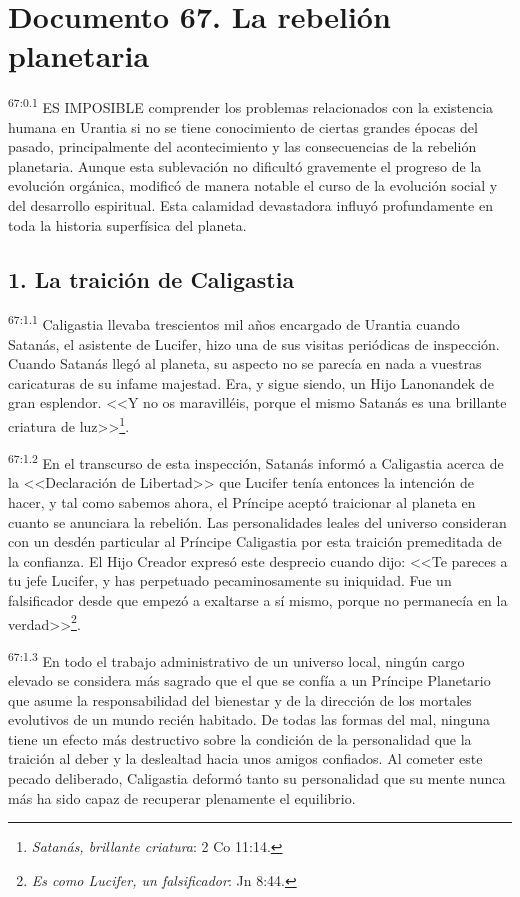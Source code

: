 \chapter{Documento 67. La rebelión planetaria}
\par
\textsuperscript{67:0.1} ES IMPOSIBLE comprender los problemas relacionados con la existencia humana en Urantia si no se tiene conocimiento de ciertas grandes épocas del pasado, principalmente del acontecimiento y las consecuencias de la rebelión planetaria. Aunque esta sublevación no dificultó gravemente el progreso de la evolución orgánica, modificó de manera notable el curso de la evolución social y del desarrollo espiritual. Esta calamidad devastadora influyó profundamente en toda la historia superfísica del planeta.

\section*{1. La traición de Caligastia}
\par
\textsuperscript{67:1.1} Caligastia llevaba trescientos mil años encargado de Urantia cuando Satanás, el asistente de Lucifer, hizo una de sus visitas periódicas de inspección. Cuando Satanás llegó al planeta, su aspecto no se parecía en nada a vuestras caricaturas de su infame majestad. Era, y sigue siendo, un Hijo Lanonandek de gran esplendor. <<Y no os maravilléis, porque el mismo Satanás es una brillante criatura de luz>>\footnote{\textit{Satanás, brillante criatura}: 2 Co 11:14.}.

\par
\textsuperscript{67:1.2} En el transcurso de esta inspección, Satanás informó a Caligastia acerca de la <<Declaración de Libertad>> que Lucifer tenía entonces la intención de hacer, y tal como sabemos ahora, el Príncipe aceptó traicionar al planeta en cuanto se anunciara la rebelión. Las personalidades leales del universo consideran con un desdén particular al Príncipe Caligastia por esta traición premeditada de la confianza. El Hijo Creador expresó este desprecio cuando dijo: <<Te pareces a tu jefe Lucifer, y has perpetuado pecaminosamente su iniquidad. Fue un falsificador desde que empezó a exaltarse a sí mismo, porque no permanecía en la verdad>>\footnote{\textit{Es como Lucifer, un falsificador}: Jn 8:44.}.

\par
\textsuperscript{67:1.3} En todo el trabajo administrativo de un universo local, ningún cargo elevado se considera más sagrado que el que se confía a un Príncipe Planetario que asume la responsabilidad del bienestar y de la dirección de los mortales evolutivos de un mundo recién habitado. De todas las formas del mal, ninguna tiene un efecto más destructivo sobre la condición de la personalidad que la traición al deber y la deslealtad hacia unos amigos confiados. Al cometer este pecado deliberado, Caligastia deformó tanto su personalidad que su mente nunca más ha sido capaz de recuperar plenamente el equilibrio.

